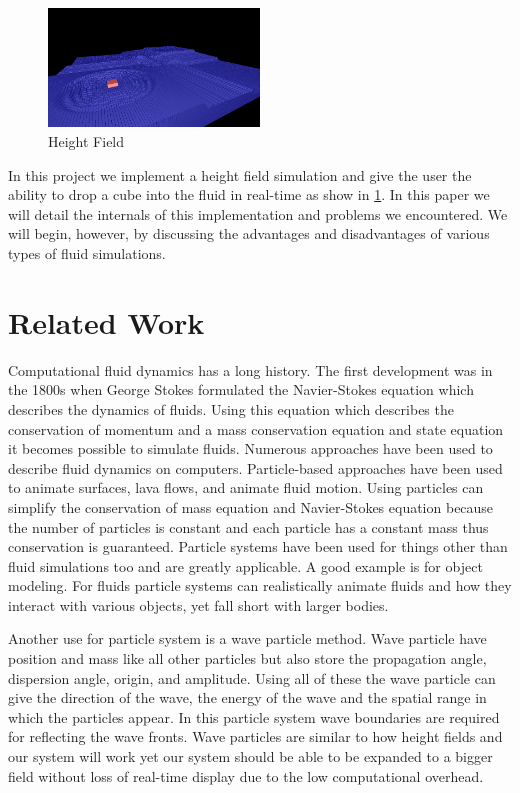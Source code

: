 \documentclass[11pt]{article}
\begin{document}
\begin{figure}[H]
    \caption{Height Field}
    \label{fig:field}
    \centering
    \includegraphics[width=0.5\textwidth]{../www/images/field}
\end{figure}

In this project we implement a height field simulation and give the user the 
ability to drop a cube into the fluid in real-time as show in \ref{fig:field}.  
In this paper we will detail the internals of this implementation and problems 
we encountered.  We will begin, however, by discussing the advantages and 
disadvantages of various types of fluid simulations.

\section{Related Work}

Computational fluid dynamics has a long history. The first development was in 
the 1800s when George Stokes formulated the Navier-Stokes equation which 
describes the dynamics of fluids. Using this equation which describes the 
conservation of momentum and a mass conservation equation and state equation it 
becomes possible to simulate fluids. \cite{particle}
Numerous approaches have been used to describe fluid dynamics on computers. 
Particle-based approaches have been used to animate surfaces, lava flows, and 
animate fluid motion. \cite{smooth}\cite{dynamic}\cite{implicit} Using 
particles can simplify the conservation of mass equation and Navier-Stokes 
equation because the number of particles is constant and each particle has a 
constant mass thus conservation is guaranteed.
Particle systems have been used for things other than fluid simulations too and 
are greatly applicable. A good example is for object modeling. \cite{oriented} 
For fluids 
particle systems can realistically animate fluids and how they interact with 
various objects, yet fall short with larger bodies. \cite{particle}

Another use for particle system is a wave particle method. Wave particle have 
position and mass like all other particles but also store the propagation 
angle, dispersion angle, origin, and amplitude. Using all of these the wave 
particle can give the direction of the wave, the energy of the wave and the 
spatial range in which the particles appear. In this particle system wave 
boundaries are required for reflecting the wave fronts. \cite{realtime} Wave 
particles are similar to how height fields and our system will work yet our 
system should be able to be expanded to a bigger field without loss of 
real-time display due to the low computational overhead.
\end{document}
